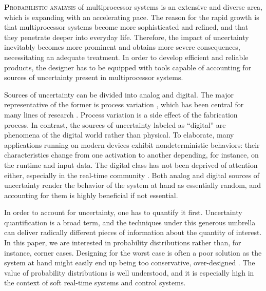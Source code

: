 \lettrine[findent=0.4em, nindent=0em]{\textbf{P}}{robabilistic analysis} of
multiprocessor systems is an extensive and diverse area, which is expanding with
an accelerating pace. The reason for the rapid growth is that multiprocessor
systems become more sophisticated and refined, and that they penetrate deeper
into everyday life. Therefore, the impact of uncertainty inevitably becomes more
prominent and obtains more severe consequences, necessitating an adequate
treatment. In order to develop efficient and reliable products, the designer has
to be equipped with tools capable of accounting for sources of uncertainty
present in multiprocessor systems.

Sources of uncertainty can be divided into analog and digital. The major
representative of the former is process variation \cite{srivastava2005}, which
has been central for many lines of research \cite{bhardwaj2008, juan2012,
lee2013, ukhov2014, ukhov2015}. Process variation is a side effect of the
fabrication process. In contrast, the sources of uncertainty labeled as
``digital'' are phenomena of the digital world rather than physical. To
elaborate, many applications running on modern devices exhibit nondeterministic
behaviors: their characteristics change from one activation to another
depending, for instance, on the runtime and input data. The digital class has
not been deprived of attention either, especially in the real-time community
\cite{diaz2002, quinton2012, tanasa2015}. Both analog and digital sources of
uncertainty render the behavior of the system at hand as essentially random, and
accounting for them is highly beneficial if not essential.

In order to account for uncertainty, one has to quantify it first. Uncertainty
quantification is a broad term, and the techniques under this generous umbrella
can deliver radically different pieces of information about the quantity of
interest. In this paper, we are interested in probability distributions rather
than, for instance, corner cases. Designing for the worst case is often a poor
solution as the system at hand might easily end up being too conservative,
over-designed \cite{quinton2012}. The value of probability distributions is well
understood, and it is especially high in the context of soft real-time systems
and control systems.

